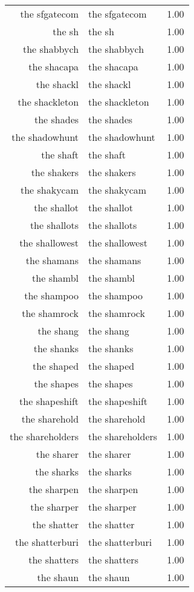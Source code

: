 \begin{table}[ht]
\begin{tabular}{rlr}
  the sfgatecom & the sfgatecom & 1.00 \\ 
  the sh & the sh & 1.00 \\ 
  the shabbych & the shabbych & 1.00 \\ 
  the shacapa & the shacapa & 1.00 \\ 
  the shackl & the shackl & 1.00 \\ 
  the shackleton & the shackleton & 1.00 \\ 
  the shades & the shades & 1.00 \\ 
  the shadowhunt & the shadowhunt & 1.00 \\ 
  the shaft & the shaft & 1.00 \\ 
  the shakers & the shakers & 1.00 \\ 
  the shakycam & the shakycam & 1.00 \\ 
  the shallot & the shallot & 1.00 \\ 
  the shallots & the shallots & 1.00 \\ 
  the shallowest & the shallowest & 1.00 \\ 
  the shamans & the shamans & 1.00 \\ 
  the shambl & the shambl & 1.00 \\ 
  the shampoo & the shampoo & 1.00 \\ 
  the shamrock & the shamrock & 1.00 \\ 
  the shang & the shang & 1.00 \\ 
  the shanks & the shanks & 1.00 \\ 
  the shaped & the shaped & 1.00 \\ 
  the shapes & the shapes & 1.00 \\ 
  the shapeshift & the shapeshift & 1.00 \\ 
  the sharehold & the sharehold & 1.00 \\ 
  the shareholders & the shareholders & 1.00 \\ 
  the sharer & the sharer & 1.00 \\ 
  the sharks & the sharks & 1.00 \\ 
  the sharpen & the sharpen & 1.00 \\ 
  the sharper & the sharper & 1.00 \\ 
  the shatter & the shatter & 1.00 \\ 
  the shatterburi & the shatterburi & 1.00 \\ 
  the shatters & the shatters & 1.00 \\ 
  the shaun & the shaun & 1.00 \\ 

\end{tabular}
\end{table}
